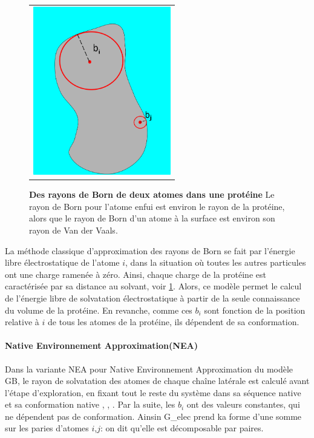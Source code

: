    \begin{figure}[!htbp]
     \centering
     \begin{tabular}{c}
       \includegraphics[width=6cm]{figure/rayon_Born.png} &
     \end{tabular}
     
     \caption{\textbf{Des rayons de Born de deux atomes dans une protéine} Le rayon de Born pour l'atome enfui est environ le rayon de la protéine, alors que le rayon de Born d'un atome à la surface est environ son rayon de Van der Vaals.} 
\label{graph:rayonBorn}
   \end{figure}


La méthode classique d'approximation des rayons de Born se fait par l'énergie libre électrostatique de l'atome $i$, dans la situation où toutes les autres particules ont une charge ramenée à zéro. Ainsi, chaque charge de la protéine est caractérisée par sa distance au solvant, voir \ref{graph:rayonBorn}. Alors, ce modèle permet le calcul de l'énergie libre de solvatation électrostatique à partir de la seule connaissance du volume de la protéine. En revanche, comme ces $b_i$ sont fonction de la position relative à $i$ de tous les atomes de la protéine, ils dépendent de sa conformation.
\paragraph{\og Native Environnement Approximation\fg (NEA)}
\label{NEA}
Dans la variante NEA pour \og Native Environnement Approximation \fg  du modèle GB, le rayon de solvatation des atomes de chaque chaîne latérale est calculé avant l'étape d'exploration, en fixant tout le reste du système dans sa séquence native et sa conformation native \cite {Polydorides11},\cite{Simonson13} , \cite{Gaillard14}. Par la suite, les $b_i$ ont des valeurs constantes, qui ne dépendent pas de conformation. Ainsin G_{elec} prend ka forme d'une somme sur les paries d'atomes $i$,$j$: on dit qu'elle est \og décomposable par paires\fg.


